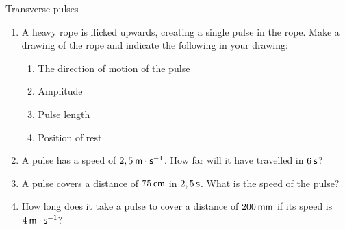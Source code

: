 \begin{eocexercises}{Transverse pulses}
            \nopagebreak
      \label{m38802*id316647}\begin{enumerate}[noitemsep, label=\textbf{\arabic*}. ] 
            \label{m38802*uid66}\item A heavy rope is flicked upwards, creating a single pulse in the rope. Make a drawing of the rope and indicate the following in your drawing:
\label{m38802*id316663}\begin{enumerate}[noitemsep, label=\textbf{\alph*}. ] 
            \label{m38802*uid67}\item The direction of motion of the pulse
\label{m38802*uid68}\item Amplitude
\label{m38802*uid69}\item Pulse length
\label{m38802*uid70}\item Position of rest
\end{enumerate}
                \label{m38802*uid71}\item A pulse has a speed of $2,5\phantom{\rule{2pt}{0ex}}\mathsf{m}\ensuremath{\cdot}\mathsf{s}{}^{-1}$. How far will it have travelled in $6\phantom{\rule{2pt}{0ex}}\mathsf{s}$?\newline
\label{m38802*uid72}\item A pulse covers a distance of $75\phantom{\rule{2pt}{0ex}}\mathsf{cm}$ in $2,5\phantom{\rule{2pt}{0ex}}\mathsf{s}$. What is the speed of the pulse?\newline
\label{m38802*uid73}\item How long does it take a pulse to cover a distance of $200\phantom{\rule{2pt}{0ex}}\mathsf{mm}$ if its speed is $4\phantom{\rule{2pt}{0ex}}\mathsf{m}\ensuremath{\cdot}\mathsf{s}{}^{-1}$?\newline

\end{enumerate}
\end{eocexercises}
